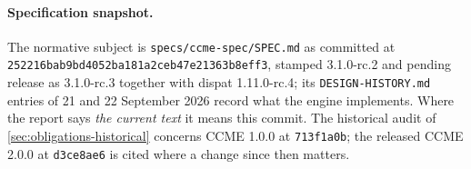 \documentclass[11pt,a4paper]{article}
\begin{document}
\paragraph{Specification snapshot.}
The normative subject is \texttt{specs/ccme-spec/SPEC.md} as committed at
\texttt{252216bab9bd4052ba181a2ceb47e21363b8eff3}, stamped 3.1.0-rc.2 and
pending release as 3.1.0-rc.3 together with dispat 1.11.0-rc.4; its
\texttt{DESIGN-HISTORY.md} entries of 21 and 22 September 2026 record what the
engine implements. Where the report says \emph{the current text} it means this
commit. The historical audit of \cref{sec:obligations-historical} concerns
CCME 1.0.0 at \texttt{713f1a0b}; the released CCME 2.0.0 at
\texttt{d3ce8ae6} is cited where a change since then matters.\par

\tableofcontents
\newpage

















\appendix



\end{document}
